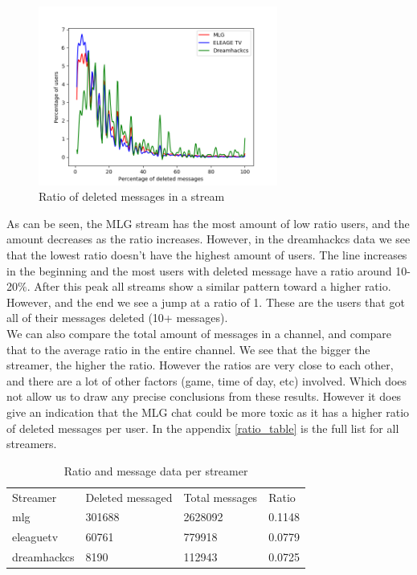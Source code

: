 \documentclass[final]{report}
\begin{document}
\begin{figure}[h]
	\centering
	\includegraphics[width=0.7\textwidth]{DeletedPerStreamer.png}
	\caption{Ratio of deleted messages in a stream}
	\label{fig:deletedPerStream}
\end{figure}

As can be seen, the MLG stream has the most amount of low ratio users, and the amount decreases as the ratio increases. However, in the dreamhackcs data we see that the lowest ratio doesn't have the highest amount of users. The line increases in the beginning and the most users with deleted message have a ratio around 10-20$\%$. After this peak all streams show a similar pattern toward a higher ratio.
However, and the end we see a jump at a ratio of 1. These are the users that got all of their messages deleted (10+ messages).\\

We can also compare the total amount of messages in a channel, and compare that to the average ratio in the entire channel. We see that the bigger the streamer, the higher the ratio. However the ratios are very close to each other, and there are a lot of other factors (game, time of day, etc) involved. Which does not allow us to draw any precise conclusions from these results. However it does give an indication that the MLG chat could be more toxic as it has a higher ratio of deleted messages per user. In the appendix \ref{ratio_table} is the full list for all streamers.

\begin{table}[]
\centering
\caption{Ratio and message data per streamer}
\label{my-label}
\begin{tabular}{l|lll}
Streamer 		 & Deleted messaged & Total messages 	& Ratio 	\\
mlg              & 301688 			& 2628092 			& 0.1148   	\\
eleaguetv        & 60761  			& 779918  			& 0.0779   	\\
dreamhackcs      & 8190   			& 112943  			& 0.0725	\\
\end{tabular}
\end{table}
\end{document}
